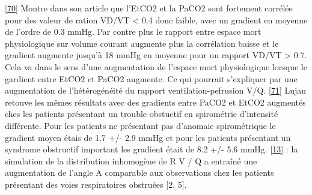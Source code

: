 \documentclass[12pt,]{article}
\begin{document}
{[}\protect\hyperlink{ref-mcswain2010end}{70}{]} Montre dans son article
que l'EtCO2 et la PaCO2 sont fortement corrélée pour des valeur de
ration VD/VT \textless{} 0.4 donc faible, avec un gradient en moyenne de
l'ordre de 0.3 mmHg. Par contre plus le rapport entre espace mort
physiologique sur volume courant augmente plus la corrélation baisse et
le gradient augmente jusqu'à 18 mmHg en moyenne pour un rapport VD/VT
\textgreater{} 0.7. Cela va dans le sens d'une augmentation de l'espace
mort physiologique lorsque le gardient entre EtCO2 et PaCO2 augmente. Ce
qui pourrait s'expliquer par une augmentation de l'hétérogénéité du
rapport ventilation-pefrusion V/Q.
{[}\protect\hyperlink{ref-lujan2008capnometry}{71}{]} Lujan retouve les
mêmes résultats avec des gradients entre PaCO2 et EtCO2 augmentés ches
les patients présentant un trouble obstuctif en spirométrie d'intensité
différente. Pour les patients ne présentant pas d'anomaie spirométrique
le gradient moyen étais de 1.7 +/- 2.9 mmHg et pour les patients
présentant un syndrome obstructif important les gradient était de 8.2
+/- 5.6 mmHg. {[}\protect\hyperlink{ref-roy2007calculating}{13}{]} : la
simulation de la distribution inhomogène de R V / Q a entraîné une
augmentation de l'angle A comparable aux observations chez les patients
présentant des voies respiratoires obstruées {[}2, 5{]}.
\end{document}
